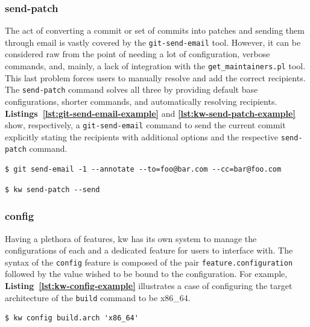 \subsubsection{send-patch}

The act of converting a commit or set of commits into patches and sending them
through email is vastly covered by the \texttt{git-send-email} tool. However, it
can be considered raw from the point of needing a lot of configuration, verbose
commands, and, mainly, a lack of integration with the
\texttt{get\_maintainers.pl} tool. This last problem forces users to manually
resolve and add the correct recipients. The \texttt{send-patch} command solves
all three by providing default base configurations, shorter commands, and
automatically resolving recipients.
\textbf{Listings~\ref{lst:git-send-email-example}} and
\textbf{\ref{lst:kw-send-patch-example}} show, respectively, a
\texttt{git-send-email} command to send the current commit explicitly stating
the recipients with additional options and the respective \texttt{send-patch}
command.

\begin{lstlisting}[caption={Example of \texttt{git-send-email} command.}, label={lst:git-send-email-example}]
$ git send-email -1 --annotate --to=foo@bar.com --cc=bar@foo.com
\end{lstlisting}

\begin{lstlisting}[caption={\texttt{kw send-patch} use case.}, label={lst:kw-send-patch-example}]
$ kw send-patch --send
\end{lstlisting} 

\subsubsection{config}

Having a plethora of features, kw has its own system to manage the
configurations of each and a dedicated feature for users to interface with. The
syntax of the \texttt{config} feature is composed of the pair
\texttt{feature.configuration} followed by the value wished to be bound to the
configuration. For example, \textbf{Listing~\ref{lst:kw-config-example}}
illustrates a case of configuring the target architecture of the \texttt{build}
command to be x86\_64.

\begin{lstlisting}[caption={\texttt{kw config} use case.}, label={lst:kw-config-example}]
$ kw config build.arch 'x86_64'
\end{lstlisting}

